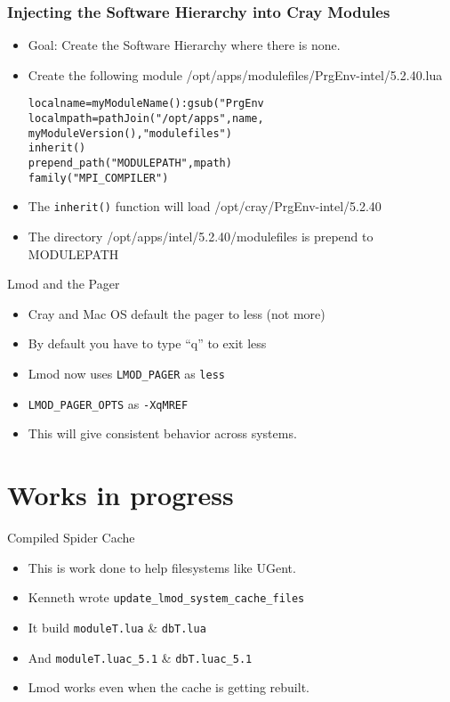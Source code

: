 \documentclass{beamer}
\begin{document}
\begin{frame}[fragile]
    \frametitle{Injecting the Software Hierarchy into Cray Modules}
  \begin{itemize}
    \item Goal: Create the Software Hierarchy where there is none.
    \item Create the following module /opt/apps/modulefiles/PrgEnv-intel/5.2.40.lua
  {\small
    \begin{alltt}

local name = myModuleName():gsub("PrgEnv%-","")
local mpath = pathJoin("/opt/apps",name,
              myModuleVersion(),"modulefiles")
inherit()
prepend_path("MODULEPATH",mpath)
family("MPI_COMPILER")
    \end{alltt}
}
    \item The \texttt{inherit()} function will load /opt/cray/PrgEnv-intel/5.2.40
    \item The directory /opt/apps/intel/5.2.40/modulefiles is prepend
      to MODULEPATH       
  \end{itemize}
\end{frame}

\begin{frame}{Lmod and the Pager}
  \begin{itemize}
    \item Cray and Mac OS default the pager to less (not more)
    \item By default you have to type ``q'' to exit less
    \item Lmod now uses \texttt{LMOD\_PAGER} as \texttt{less}
    \item \texttt{LMOD\_PAGER\_OPTS} as \texttt{-XqMREF}
    \item This will give consistent behavior across systems.
  \end{itemize}
\end{frame}


\section{Works in progress}

\begin{frame}{Compiled Spider Cache }
  \begin{itemize}
    \item This is work done to help filesystems like UGent.
    \item Kenneth wrote \texttt{update\_lmod\_system\_cache\_files}
    \item It build \texttt{moduleT.lua} \& \texttt{dbT.lua}
    \item And \texttt{moduleT.luac\_5.1} \& \texttt{dbT.luac\_5.1}
    \item Lmod works even when the cache is getting rebuilt.
  \end{itemize}
\end{frame}
\end{document}
